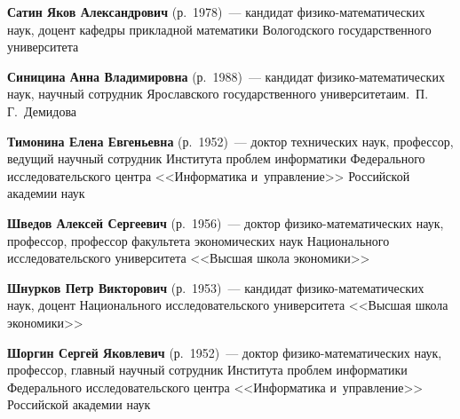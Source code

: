 \begin{multicols}{2}
\vspace*{4pt}
 
 \noindent
\textbf{Сатин Яков Александрович} (р.\ 1978)~--- кандидат фи\-зи\-ко-ма\-те\-ма\-ти\-че\-ских наук, 
доцент ка\-фед\-ры при\-клад\-ной математики Вологодского государственного университета


\columnbreak

\noindent
\textbf{Синицина Анна Владимировна} (р.\ 1988)~--- кандидат фи\-зи\-ко-ма\-те\-ма\-ти\-че\-ских наук,
научный сотрудник Ярославского государственного университета\linebreak им.\ П.\,Г.~Демидова
 
\vspace*{4pt}

\noindent
\textbf{Тимонина Елена Евгеньевна} (р.\ 1952)~--- 
доктор технических наук, профессор, ведущий научный сотрудник Института проб\-лем информатики Федерального исследовательского цент\-ра
<<\mbox{Информатика} и~управ\-ле\-ние>> Российской академии наук

\vspace*{4pt}

\noindent
\textbf{Шведов Алексей Сергеевич} (р.\ 1956)~--- 
доктор фи\-зи\-ко-ма\-те\-ма\-ти\-че\-ских наук, профессор, профессор факультета экономических наук Национального исследовательского университета 
<<Высшая школа экономики>>

\vspace*{4pt}

\noindent
\textbf{Шнурков Петр Викторович} (р.\ 1953)~--- кандидат фи\-зи\-ко-ма\-те\-ма\-ти\-че\-ских наук, 
доцент Национального исследовательского университета <<Высшая школа экономики>>

\vspace*{4pt}

\noindent
\textbf{Шоргин Сергей Яковлевич} (р.\ 1952)~--- доктор фи\-зи\-ко-ма\-те\-ма\-ти\-че\-ских 
наук, профессор, главный научный сотрудник Института проб\-лем информатики Федерального исследовательского цент\-ра 
<<Информатика и~управ\-ле\-ние>> Российской академии наук




\def\leftkol{ОБ АВТОРАХ}

\def\rightkol{ОБ АВТОРАХ}


 \label{end\stat}



\end{multicols}

\def\leftkol{ОБ АВТОРАХ}
\def\rightkol{ОБ АВТОРАХ}

\newpage
